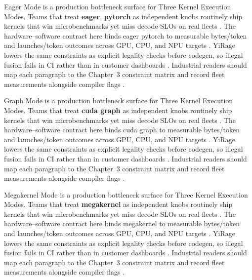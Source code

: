 Eager Mode is a production bottleneck surface for Three Kernel Execution Modes. Teams that treat \textbf{eager}, \textbf{pytorch} as independent knobs routinely ship kernels that win microbenchmarks yet miss decode SLOs on real fleets \citep{nvidia2024cudagraphs,taxbreak2026}. The hardware--software contract here binds eager pytorch to measurable bytes/token and launches/token outcomes across GPU, CPU, and NPU targets \citep{liu2024deepseekv3,memoryfloor2026}. YiRage lowers the same constraints as explicit legality checks before codegen, so illegal fusion fails in CI rather than in customer dashboards \citep{patel2025llminference,nvidia2022hopper}. Industrial readers should map each paragraph to the Chapter~3 constraint matrix and record fleet measurements alongside compiler flags \citep{taxbreak2026,semianalysis2024tma}.

Graph Mode is a production bottleneck surface for Three Kernel Execution Modes. Teams that treat \textbf{cuda graph} as independent knobs routinely ship kernels that win microbenchmarks yet miss decode SLOs on real fleets \citep{liu2024deepseekv3,memoryfloor2026}. The hardware--software contract here binds cuda graph to measurable bytes/token and launches/token outcomes across GPU, CPU, and NPU targets \citep{patel2025llminference,nvidia2022hopper}. YiRage lowers the same constraints as explicit legality checks before codegen, so illegal fusion fails in CI rather than in customer dashboards \citep{taxbreak2026,semianalysis2024tma}. Industrial readers should map each paragraph to the Chapter~3 constraint matrix and record fleet measurements alongside compiler flags \citep{memoryfloor2026,amd2024xdna}.

Megakernel Mode is a production bottleneck surface for Three Kernel Execution Modes. Teams that treat \textbf{megakernel} as independent knobs routinely ship kernels that win microbenchmarks yet miss decode SLOs on real fleets \citep{patel2025llminference,nvidia2022hopper}. The hardware--software contract here binds megakernel to measurable bytes/token and launches/token outcomes across GPU, CPU, and NPU targets \citep{taxbreak2026,semianalysis2024tma}. YiRage lowers the same constraints as explicit legality checks before codegen, so illegal fusion fails in CI rather than in customer dashboards \citep{memoryfloor2026,amd2024xdna}. Industrial readers should map each paragraph to the Chapter~3 constraint matrix and record fleet measurements alongside compiler flags \citep{nvidia2022hopper,amd2024aie}.

